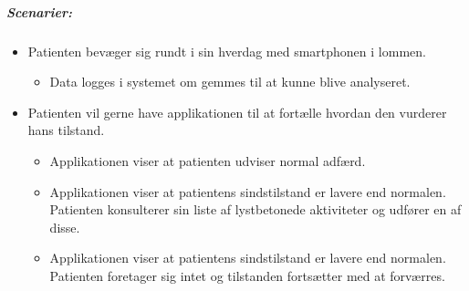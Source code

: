 \subparagraph{Scenarier:}
\begin{itemize}
	\item Patienten bevæger sig rundt i sin hverdag med smartphonen i lommen. 
	\begin{itemize}
		\item Data logges i systemet om gemmes til at kunne blive analyseret.
	\end{itemize}
	
	\item Patienten vil gerne have applikationen til at fortælle hvordan den vurderer hans tilstand.
	\begin{itemize}
		\item Applikationen viser at patienten udviser normal adfærd.
		\item Applikationen viser at patientens sindstilstand er lavere end normalen. Patienten konsulterer sin liste af lystbetonede aktiviteter og udfører en af disse.
		\item Applikationen viser at patientens sindstilstand er lavere end normalen. Patienten foretager sig intet og tilstanden fortsætter med at forværres.
	\end{itemize}	

\end{itemize}

